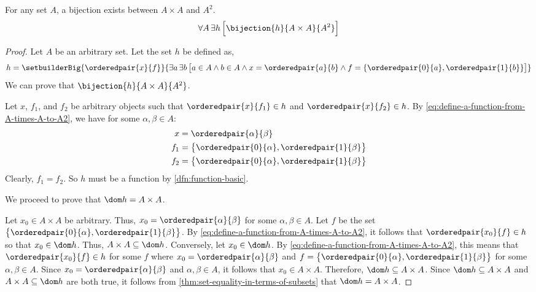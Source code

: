 \begin{thm}
    \label{thm:a-bijection-exists-between-A-times-A-and-A2}
    For any set \( A \), a bijection exists between \( A \times A \) and \( A^{2} \).
    \begin{equation*}
        \forall A \, \exists h \, \Big[ \bijection{h}{A \times A}{A^{2}} \Big]
    \end{equation*}
\end{thm}

\begin{proof}
    Let \( A \) be an arbitrary set. Let the set \( h \) be defined as,
    \begin{equation}
        \label{eq:define-a-function-from-A-times-A-to-A2}
        h = \setbuilderBig{\orderedpair{x}{f}}{\exists a \, \exists b \,
        \big[ a \in A \land b \in A \land x = \orderedpair{a}{b}
        \land
        f = \mleft\{ \orderedpair{0}{a}, \orderedpair{1}{b} \mright\} \big]}
    \end{equation}
    We can prove that \( \bijection{h}{A \times A}{A^{2}} \).

    \vspace{0.3cm}
    \noindent
    Let \( x \), \( f_{1} \), and \( f_{2} \) be arbitrary objects such that \( \orderedpair{x}{f_{1}} \in h \)
    and \( \orderedpair{x}{f_{2}} \in h \). By \eqref{eq:define-a-function-from-A-times-A-to-A2}, we have for some
    \( \alpha,\beta \in A \):
    \begin{align*}
        x &= \orderedpair{\alpha}{\beta} \\
        f_{1} &= \big\{ \orderedpair{0}{\alpha}, \orderedpair{1}{\beta} \big\} \\
        f_{2} &= \big\{ \orderedpair{0}{\alpha}, \orderedpair{1}{\beta} \big\}
    \end{align*}
    Clearly, \( f_{1} = f_{2}\). So \( h \) must be a function by \cref{dfn:function-basic}.

    \vspace{0.3cm}
    \noindent
    We proceed to prove that \( \dom h = A \times A \).

    \vspace{0.3cm}
    \noindent
    Let \( x_{0} \in A \times A \) be arbitrary. Thus, \( x_{0} = \orderedpair{\alpha}{\beta} \) for some \( \alpha,\beta \in A \).
    Let \( f \) be the set \( \big\{ \orderedpair{0}{\alpha}, \orderedpair{1}{\beta} \big\} \).
    By \eqref{eq:define-a-function-from-A-times-A-to-A2}, it follows that \( \orderedpair{x_{0}}{f} \in h \) so that \( x_{0} \in \dom h \).
    Thus, \( A \times A \subseteq \dom h \).
    Conversely, let \( x_{0} \in \dom h \). By \eqref{eq:define-a-function-from-A-times-A-to-A2}, this means that \( \orderedpair{x_{0}}{f} \in h \)
    for some \( f \) where \( x_{0} = \orderedpair{\alpha}{\beta} \) and \( f = \big\{ \orderedpair{0}{\alpha}, \orderedpair{1}{\beta} \big\} \) for
    some \( \alpha,\beta \in A \).
    Since \( x_{0} = \orderedpair{\alpha}{\beta} \) and \( \alpha,\beta \in A \), it follows that \( x_{0} \in A \times A \).
    Therefore, \( \dom h \subseteq A \times A \). Since \( \dom h \subseteq A \times A \) and \( A \times A \subseteq \dom h \) are both true,
    it follows from \cref{thm:set-equality-in-terms-of-subsets} that \( \dom h = A \times A \).


\end{proof}
